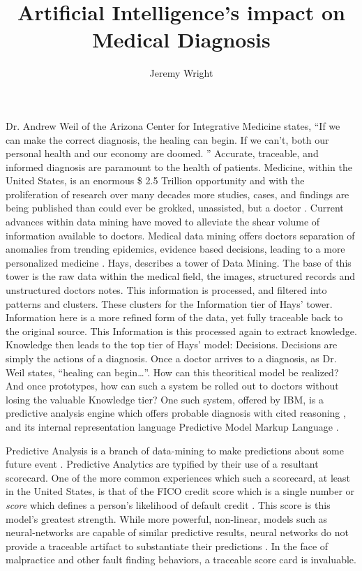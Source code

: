 \documentclass[12pt,letterpaper]{article}
\title{Artificial Intelligence's impact on Medical Diagnosis}
\author{Jeremy Wright}
\begin{document}
\maketitle


Dr. Andrew Weil of the Arizona Center for Integrative Medicine states, ``If we
can make the correct diagnosis, the healing can begin. If we can't, both our
personal health and our economy are doomed. \autocite{Weil2009}'' Accurate,
traceable, and informed diagnosis are paramount to the health of patients.
Medicine, within the United States, is an enormous \$ 2.5 Trillion
opportunity and with the proliferation of research over many decades more
studies, cases, and findings are being published than could ever be grokked,
unassisted, but a doctor \autocite{Hays2012}.  Current advances within data
mining have moved to alleviate the shear volume of information available to
doctors. Medical data mining offers doctors separation of anomalies from
trending epidemics, evidence based decisions, leading to a more personalized
medicine \autocite{Hays2012}. Hays, describes a tower of Data Mining. The base
of this tower is the raw data within the medical field, the images, structured
records and unstructured doctors notes. This information is processed, and
filtered into patterns and clusters. These clusters for the Information tier of
Hays' tower. Information here is a more refined form of the data, yet fully
traceable back to the original source. This Information is this processed again
to extract knowledge. Knowledge then leads to the top tier of Hays' model:
Decisions. Decisions are simply the actions of a diagnosis. Once a doctor
arrives to a diagnosis, as Dr. Weil states, ``healing can begin\ldots''. How can
this theoritical model be realized? And once prototypes, how can such a system
be rolled out to doctors without losing the valuable Knowledge tier?
One such system, offered by IBM, is a predictive analysis engine which offers
probable diagnosis with cited reasoning \autocite{Guazzelli2011}, and its
internal representation language Predictive Model Markup Language
\autocite{WikiPredictiveLanguage}.

Predictive Analysis is a branch of data-mining to make predictions about some
future event \autocite{WikiPredictiveAnalysis}. Predictive Analytics are
typified by their use of a resultant scorecard. One of the more common
experiences which such a scorecard, at least in the United States, is that of
the FICO credit score which is a single number or \emph{score} which defines
a person's likelihood of default credit \autocite{Guazzelli2011}. This score is this
model's greatest strength. While more powerful, non-linear, models such as
neural-networks are capable of similar predictive results, neural networks do
not provide a traceable artifact to substantiate their predictions
\autocite{Segaran2008}. In the face
of malpractice and other fault finding behaviors, a traceable score card is
invaluable.
\end{document}
